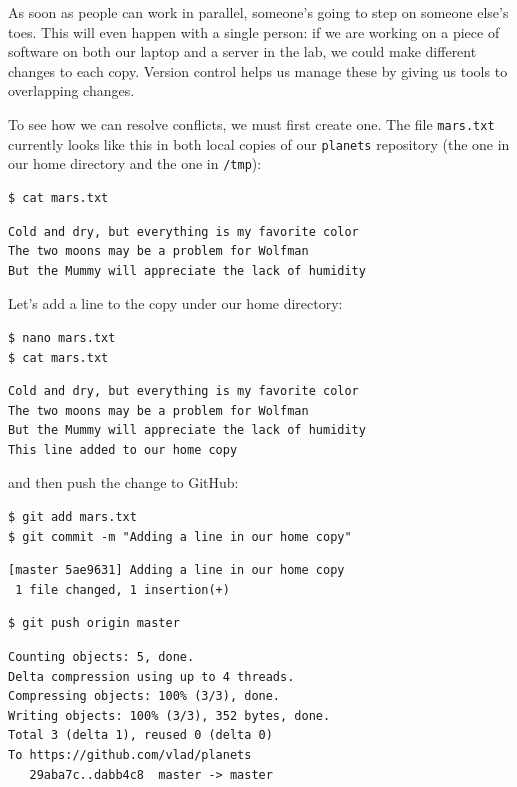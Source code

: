 \documentclass{book}
\begin{document}
As soon as people can work in parallel, someone's going to step on
someone else's toes. This will even happen with a single person: if we
are working on a piece of software on both our laptop and a server in
the lab, we could make different changes to each copy. Version control
helps us manage these  by giving us
tools to  overlapping changes.

To see how we can resolve conflicts, we must first create one. The file
\texttt{mars.txt} currently looks like this in both local copies of our
\texttt{planets} repository (the one in our home directory and the one
in \texttt{/tmp}):

\begin{verbatim}
$ cat mars.txt
\end{verbatim}

\begin{verbatim}
Cold and dry, but everything is my favorite color
The two moons may be a problem for Wolfman
But the Mummy will appreciate the lack of humidity
\end{verbatim}

Let's add a line to the copy under our home directory:

\begin{verbatim}
$ nano mars.txt
$ cat mars.txt
\end{verbatim}

\begin{verbatim}
Cold and dry, but everything is my favorite color
The two moons may be a problem for Wolfman
But the Mummy will appreciate the lack of humidity
This line added to our home copy
\end{verbatim}

and then push the change to GitHub:

\begin{verbatim}
$ git add mars.txt
$ git commit -m "Adding a line in our home copy"
\end{verbatim}

\begin{verbatim}
[master 5ae9631] Adding a line in our home copy
 1 file changed, 1 insertion(+)
\end{verbatim}

\begin{verbatim}
$ git push origin master
\end{verbatim}

\begin{verbatim}
Counting objects: 5, done.
Delta compression using up to 4 threads.
Compressing objects: 100% (3/3), done.
Writing objects: 100% (3/3), 352 bytes, done.
Total 3 (delta 1), reused 0 (delta 0)
To https://github.com/vlad/planets
   29aba7c..dabb4c8  master -> master
\end{verbatim}
\end{document}
